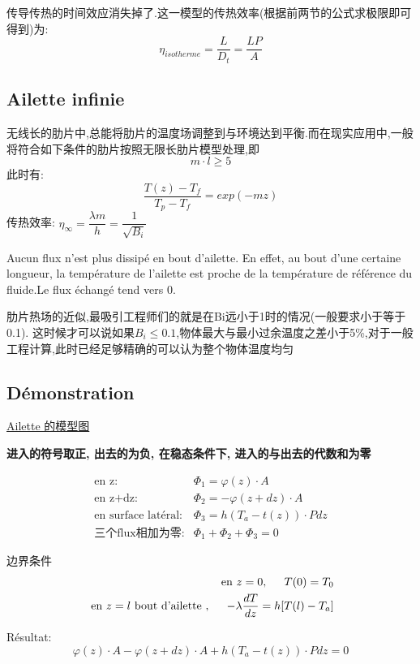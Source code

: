 \documentclass{article}
\begin{document}
传导传热的时间效应消失掉了.这一模型的传热效率(根据前两节的公式求极限即可得到)为:
$$
\eta_{isotherme} = \dfrac{L}{D_t} = \dfrac{LP}{A}
$$

\subsection{Ailette infinie}
无线长的肋片中,总能将肋片的温度场调整到与环境达到平衡.而在现实应用中,一般将符合如下条件的肋片按照无限长肋片模型处理,即
$$ m\cdot l \geq 5 $$
此时有:
$$ \frac{T(z)-T_f}{T_p - T_f}=exp(-mz) $$
传热效率: $\eta_{\infty} = \dfrac{\lambda m}{h} = \dfrac{1}{\sqrt{B_i}}$

Aucun flux n'est plus dissip\'e en bout d'ailette. En effet, au bout d'une certaine longueur, la temp\'erature de l'ailette est proche de la temp\'erature de r\'ef\'erence du fluide.Le flux \'echang\'e tend vers $0$.

肋片热场的近似,最吸引工程师们的就是在Bi远小于1时的情况(一般要求小于等于0.1).
这时候才可以说如果$B_i \leq 0.1$,物体最大与最小过余温度之差小于5\%,对于一般工程计算,此时已经足够精确的可以认为整个物体温度均匀

\subsection{D\'emonstration}
\href{http://i.imgbox.com/IttTCHOi.png}{Ailette 的模型图}

\textbf{进入的符号取正, 出去的为负, 在稳态条件下, 进入的与出去的代数和为零}

\begin{eqnarray}
\text{en z:} & \Phi_1=\varphi(z)\cdot A \\
\text{en z+dz:} &\Phi_2=-\varphi(z+dz) \cdot A\\
\text{en surface lat\'eral:} & \Phi_3=h(T_a - t(z)) \cdot P dz \\
\text{三个flux相加为零:}  &\Phi_1 + \Phi_2 + \Phi_3 = 0
\end{eqnarray}

边界条件
\begin{equation}
\begin{aligned}
\text{ en } z = 0, \hspace{0.5cm} T(0) = T_0 \\
\text{ en } z = l \text{ bout d'ailette }, \hspace{0.5cm} - \lambda \frac{dT}{dz} = h[T(l) - T_a]
\end{aligned}
\end{equation}

R\'esultat:
$$ \varphi(z)\cdot A -\varphi(z+dz)\cdot A + h(T_a - t(z)) \cdot P dz = 0 $$
\end{document}
